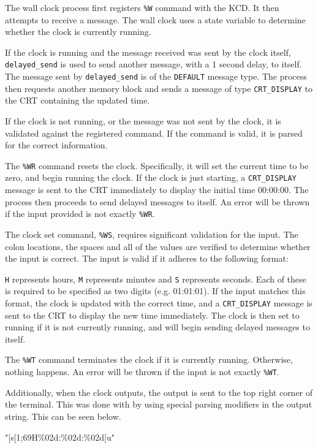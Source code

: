 \documentclass[se]{uw-wkrpt}
\begin{document}
The wall clock process first registers \texttt{\%W} command with the KCD. It then attempts to receive a message. The wall clock uses a state variable to determine whether the clock is currently running.

If the clock is running and the message received was sent by the clock itself, \texttt{delayed\_send} is used to send another message, with a 1 second delay, to itself. The message sent by \texttt{delayed\_send} is of the \texttt{DEFAULT} message type. The process then requests another memory block and sends a message of type \texttt{CRT\_DISPLAY} to the CRT containing the updated time.

If the clock is not running, or the message was not sent by the clock, it is validated against the registered command. If the command is valid, it is parsed for the correct information.

The \texttt{\%WR} command resets the clock. Specifically, it will set the current time to be zero, and begin running the clock. If the clock is just starting, a \texttt{CRT\_DISPLAY} message is sent to the CRT immediately to display the initial time 00:00:00. The process then proceeds to send delayed messages to itself. An error will be thrown if the input provided is not exactly \texttt{\%WR}.

The clock set command, \texttt{\%WS},  requires significant validation for the input. The colon locations, the spaces and all of the values are verified to determine whether the input is correct. The input is valid if it adheres to the following format:
\begin{code}
\end{code}

\texttt{H} represents hours, \texttt{M} represents minutes and \texttt{S} represents seconds. Each of these is required to be specified as two digits (e.g. 01:01:01). If the input matches this format, the clock is updated with the correct time, and a \texttt{CRT\_DISPLAY} message is sent to the CRT to display the new time immediately. The clock is then set to running if it is not currently running, and will begin sending delayed messages to itself.

The \texttt{\%WT} command terminates the clock if it is currently running. Otherwise, nothing happens. An error will be thrown if the input is not exactly \texttt{\%WT}.

Additionally, when the clock outputs, the output is sent to the top right corner of the terminal. This was done with by using special parsing modifiers in the output string. This can be seen below.
\begin{code}
"[s[1;69H\%02d:\%02d:\%02d\n{}[u"
\end{code}
\end{document}
